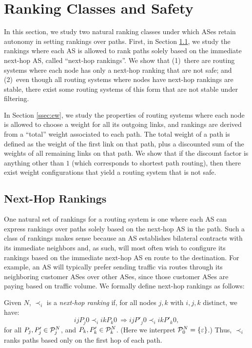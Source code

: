 \section{Ranking Classes and Safety}
\label{sec:nexthop}

In this section, we study two natural ranking classes under which ASes
retain autonomy in setting rankings over paths.  First, in Section
\ref{ssec:nhp}, we study the
rankings where each AS is allowed to rank paths solely
based on the immediate next-hop AS, called ``next-hop rankings''.  We show that (1)~there are routing systems where
each node has only a next-hop ranking that are not safe;
and (2)~even though all routing systems where nodes have next-hop
rankings are stable, there exist some routing systems of
this form that are not stable under filtering.  

In Section
\ref{ssec:ew}, we study the
properties of routing systems where each node is allowed to choose a
weight for all its outgoing links, and rankings are
derived from a ``total'' weight associated to each path.  The total weight of a
path is defined as the weight of the first link on that path, plus a
discounted sum of the weights of all remaining links on that path.  We
show that if the discount factor is anything other than $1$ (which
corresponds to shortest path routing), then there exist weight configurations
that yield a routing system that is not safe.

\subsection{Next-Hop Rankings}
\label{ssec:nhp}

One natural set of rankings for a routing system is one where each AS
can express rankings over paths solely based on the next-hop AS in
the path.  
Such a class of rankings makes sense because an AS establishes
bilateral contracts with its immediate neighbors and, as such, will most
often wish
to configure its rankings based on the immediate next-hop AS en route
to the destination.  For example, an AS will typically prefer sending
traffic via routes through its neighboring customer ASes over other
ASes, since those customer ASes are paying based on traffic volume. 
We formally define next-hop rankings as follows:

\begin{defn}
\label{def:next-hop}
Given $N$, $\prec_i$ is a {\em next-hop ranking} if, for all nodes $j,
k$ with $i,j,k$ distinct, we have: 
\begin{equation}
\label{eq:nh}
i j P_j 0 \prec_i i k P_k 0\ \Rightarrow  i j P'_j 0 \prec_i i k P'_k
0,
\end{equation}
for all $P_j, P'_j \in \P_j^N$, and $P_k, P'_k \in \P_k^N$.
(Here we interpret $\P_0^N = \{ \epsilon \}$.)
%
Thus, $\prec_i$ ranks paths based only on the first hop of each path.
\end{defn}

